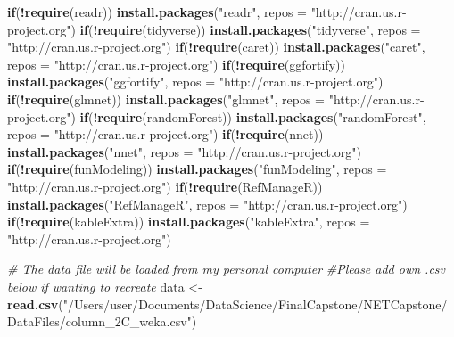 \documentclass[
]{article}
\newenvironment{Shaded}{\begin{snugshade}}{\end{snugshade}}
\newcommand{\CommentTok}[1]{\textcolor[rgb]{0.56,0.35,0.01}{\textit{#1}}}
\newcommand{\ControlFlowTok}[1]{\textcolor[rgb]{0.13,0.29,0.53}{\textbf{#1}}}
\newcommand{\DataTypeTok}[1]{\textcolor[rgb]{0.13,0.29,0.53}{#1}}
\newcommand{\KeywordTok}[1]{\textcolor[rgb]{0.13,0.29,0.53}{\textbf{#1}}}
\newcommand{\NormalTok}[1]{#1}
\newcommand{\OperatorTok}[1]{\textcolor[rgb]{0.81,0.36,0.00}{\textbf{#1}}}
\newcommand{\StringTok}[1]{\textcolor[rgb]{0.31,0.60,0.02}{#1}}
\begin{document}
\begin{Shaded}
\begin{Highlighting}[]
\ControlFlowTok{if}\NormalTok{(}\OperatorTok{!}\KeywordTok{require}\NormalTok{(readr)) }\KeywordTok{install.packages}\NormalTok{(}\StringTok{"readr"}\NormalTok{, }\DataTypeTok{repos =} \StringTok{"http://cran.us.r-project.org"}\NormalTok{)}
\ControlFlowTok{if}\NormalTok{(}\OperatorTok{!}\KeywordTok{require}\NormalTok{(tidyverse)) }\KeywordTok{install.packages}\NormalTok{(}\StringTok{"tidyverse"}\NormalTok{, }\DataTypeTok{repos =} \StringTok{"http://cran.us.r-project.org"}\NormalTok{)}
\ControlFlowTok{if}\NormalTok{(}\OperatorTok{!}\KeywordTok{require}\NormalTok{(caret)) }\KeywordTok{install.packages}\NormalTok{(}\StringTok{"caret"}\NormalTok{, }\DataTypeTok{repos =} \StringTok{"http://cran.us.r-project.org"}\NormalTok{)}
\ControlFlowTok{if}\NormalTok{(}\OperatorTok{!}\KeywordTok{require}\NormalTok{(ggfortify)) }\KeywordTok{install.packages}\NormalTok{(}\StringTok{"ggfortify"}\NormalTok{, }\DataTypeTok{repos =} \StringTok{"http://cran.us.r-project.org"}\NormalTok{)}
\ControlFlowTok{if}\NormalTok{(}\OperatorTok{!}\KeywordTok{require}\NormalTok{(glmnet)) }\KeywordTok{install.packages}\NormalTok{(}\StringTok{"glmnet"}\NormalTok{, }\DataTypeTok{repos =} \StringTok{"http://cran.us.r-project.org"}\NormalTok{)}
\ControlFlowTok{if}\NormalTok{(}\OperatorTok{!}\KeywordTok{require}\NormalTok{(randomForest)) }\KeywordTok{install.packages}\NormalTok{(}\StringTok{"randomForest"}\NormalTok{, }\DataTypeTok{repos =} \StringTok{"http://cran.us.r-project.org"}\NormalTok{)}
\ControlFlowTok{if}\NormalTok{(}\OperatorTok{!}\KeywordTok{require}\NormalTok{(nnet)) }\KeywordTok{install.packages}\NormalTok{(}\StringTok{"nnet"}\NormalTok{, }\DataTypeTok{repos =} \StringTok{"http://cran.us.r-project.org"}\NormalTok{)}
\ControlFlowTok{if}\NormalTok{(}\OperatorTok{!}\KeywordTok{require}\NormalTok{(funModeling)) }\KeywordTok{install.packages}\NormalTok{(}\StringTok{"funModeling"}\NormalTok{, }\DataTypeTok{repos =} \StringTok{"http://cran.us.r-project.org"}\NormalTok{)}
\ControlFlowTok{if}\NormalTok{(}\OperatorTok{!}\KeywordTok{require}\NormalTok{(RefManageR)) }\KeywordTok{install.packages}\NormalTok{(}\StringTok{"RefManageR"}\NormalTok{, }\DataTypeTok{repos =} \StringTok{"http://cran.us.r-project.org"}\NormalTok{)}
\ControlFlowTok{if}\NormalTok{(}\OperatorTok{!}\KeywordTok{require}\NormalTok{(kableExtra)) }\KeywordTok{install.packages}\NormalTok{(}\StringTok{"kableExtra"}\NormalTok{, }\DataTypeTok{repos =} \StringTok{"http://cran.us.r-project.org"}\NormalTok{)}

\CommentTok{# The data file will be loaded from my personal computer}
\CommentTok{#Please add own .csv below if wanting to recreate}
\NormalTok{data <-}\StringTok{ }\KeywordTok{read.csv}\NormalTok{(}\StringTok{"/Users/user/Documents/DataScience/FinalCapstone/NETCapstone/DataFiles/column_2C_weka.csv"}\NormalTok{)}
\end{Highlighting}
\end{Shaded}
\end{document}
